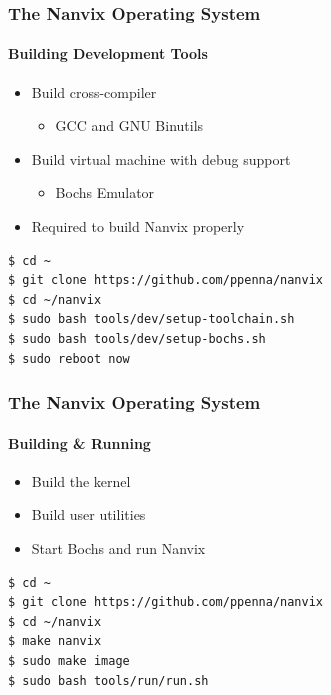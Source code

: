\documentclass{beamer}
\begin{document}
	\begin{frame}[containsverbatim]
	\frametitle{The Nanvix Operating System}
	\framesubtitle{Building Development Tools}
	\begin{itemize}
	\setlength\itemsep{1.0em}
		\item Build cross-compiler
		\begin{itemize}
			\item GCC and GNU Binutils
		\end{itemize}

		\item Build virtual machine with debug support
		\begin{itemize}
			\item Bochs Emulator
		\end{itemize}

		\item Required to build Nanvix properly
	\end{itemize}
	\vfill	
	\begin{lstlisting}[language=bash,numbers=none,frame=single]
$ cd ~
$ git clone https://github.com/ppenna/nanvix
$ cd ~/nanvix
$ sudo bash tools/dev/setup-toolchain.sh
$ sudo bash tools/dev/setup-bochs.sh
$ sudo reboot now
	\end{lstlisting}
	\end{frame}

	\begin{frame}[containsverbatim]
	\frametitle{The Nanvix Operating System}
	\framesubtitle{Building \& Running}
	\begin{itemize}
	\setlength\itemsep{1.0em}
		\item Build the kernel

		\item Build user utilities 

		\item Start Bochs and run Nanvix
	\end{itemize}
	\vfill
	\begin{lstlisting}[language=bash,numbers=none,frame=single]
$ cd ~
$ git clone https://github.com/ppenna/nanvix
$ cd ~/nanvix
$ make nanvix
$ sudo make image
$ sudo bash tools/run/run.sh
	\end{lstlisting}
	\end{frame}
\end{document}
